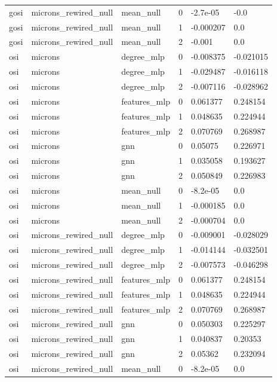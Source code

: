 \begin{table}[htbp]
\begin{tabular}{llllll}
    gosi & microns\_rewired\_null & mean\_null & 0 & -2.7e-05 & -0.0 \\
    gosi & microns\_rewired\_null & mean\_null & 1 & -0.000207 & 0.0 \\
    gosi & microns\_rewired\_null & mean\_null & 2 & -0.001 & 0.0 \\
    osi & microns & degree\_mlp & 0 & -0.008375 & -0.021015 \\
    osi & microns & degree\_mlp & 1 & -0.029487 & -0.016118 \\
    osi & microns & degree\_mlp & 2 & -0.007116 & -0.028962 \\
    osi & microns & features\_mlp & 0 & 0.061377 & 0.248154 \\
    osi & microns & features\_mlp & 1 & 0.048635 & 0.224944 \\
    osi & microns & features\_mlp & 2 & 0.070769 & 0.268987 \\
    osi & microns & gnn & 0 & 0.05075 & 0.226971 \\
    osi & microns & gnn & 1 & 0.035058 & 0.193627 \\
    osi & microns & gnn & 2 & 0.050849 & 0.226983 \\
    osi & microns & mean\_null & 0 & -8.2e-05 & 0.0 \\
    osi & microns & mean\_null & 1 & -0.000185 & 0.0 \\
    osi & microns & mean\_null & 2 & -0.000704 & 0.0 \\
    osi & microns\_rewired\_null & degree\_mlp & 0 & -0.009001 & -0.028029 \\
    osi & microns\_rewired\_null & degree\_mlp & 1 & -0.014144 & -0.032501 \\
    osi & microns\_rewired\_null & degree\_mlp & 2 & -0.007573 & -0.046298 \\
    osi & microns\_rewired\_null & features\_mlp & 0 & 0.061377 & 0.248154 \\
    osi & microns\_rewired\_null & features\_mlp & 1 & 0.048635 & 0.224944 \\
    osi & microns\_rewired\_null & features\_mlp & 2 & 0.070769 & 0.268987 \\
    osi & microns\_rewired\_null & gnn & 0 & 0.050303 & 0.225297 \\
    osi & microns\_rewired\_null & gnn & 1 & 0.040837 & 0.20353 \\
    osi & microns\_rewired\_null & gnn & 2 & 0.05362 & 0.232094 \\
    osi & microns\_rewired\_null & mean\_null & 0 & -8.2e-05 & 0.0 \\

\end{tabular}
\end{table}
